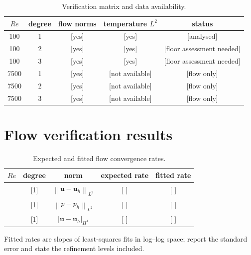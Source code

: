 \documentclass[11pt,a4paper]{article}
\newcommand{\norm}[1]{\left\lVert #1 \right\rVert}
\newcommand{\seminorm}[1]{\left\lvert #1 \right\rvert}
\begin{document}
\begin{table}[htbp]
  \centering
  \caption{Verification matrix and data availability.}
  \label{tab:verification-matrix}
  \begin{tabular}{ccccc}
    \toprule
    $Re$ & degree & flow norms & temperature $L^2$ & status \\
    \midrule
    100  & 1 & [yes] & [yes] & [analysed] \\
    100  & 2 & [yes] & [yes] & [floor assessment needed] \\
    100  & 3 & [yes] & [yes] & [floor assessment needed] \\
    7500 & 1 & [yes] & [not available] & [flow only] \\
    7500 & 2 & [yes] & [not available] & [flow only] \\
    7500 & 3 & [yes] & [not available] & [flow only] \\
    \bottomrule
  \end{tabular}
\end{table}

\section{Flow verification results}

\begin{table}[htbp]
  \centering
  \caption{Expected and fitted flow convergence rates.}
  \label{tab:flow-rates}
  \begin{threeparttable}
  \begin{tabular}{ccccc}
    \toprule
    $Re$ & degree & norm & expected rate & fitted rate \\
    \midrule
    [100/7500] & [1] & $\norm{\bm{u}-\bm{u}_h}_{L^2}$ & [ ] & [ ] \\
    [100/7500] & [1] & $\norm{p-p_h}_{L^2}$            & [ ] & [ ] \\
    [100/7500] & [1] & $\seminorm{\bm{u}-\bm{u}_h}_{H^1}$ & [ ] & [ ] \\
    \bottomrule
  \end{tabular}
  \begin{tablenotes}[flushleft]
    \footnotesize
    \item Fitted rates are slopes of least-squares fits in log--log space;
    report the standard error and state the refinement levels included.
  \end{tablenotes}
  \end{threeparttable}
\end{table}
\end{document}
